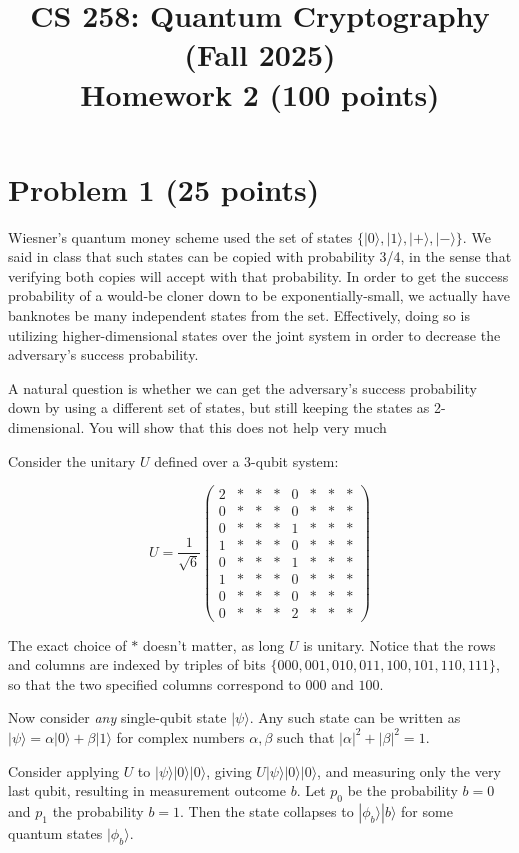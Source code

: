 \documentclass{article}
\title{CS 258: Quantum Cryptography (Fall 2025)\\ Homework 2 (100 points)}
\author{}
\date{}
\begin{document}
\maketitle



\section{Problem 1 (25 points)}

Wiesner's quantum money scheme used the set of states $\{|0\rangle,|1\rangle,|+\rangle,|-\rangle\}$. We said in class that such states can be copied with probability 3/4, in the sense that verifying both copies will accept with that probability. In order to get the success probability of a would-be cloner down to be exponentially-small, we actually have banknotes be many independent states from the set. Effectively, doing so is utilizing higher-dimensional states over the joint system in order to decrease the adversary's success probability.

A natural question is whether we can get the adversary's success probability down by using a different set of states, but still keeping the states as 2-dimensional. You will show that this does not help very much

Consider the unitary $U$ defined over a 3-qubit system:

\[U=\frac{1}{\sqrt{6}}\left(\begin{array}{cccccccc}
2&*&*&*&0&*&*&*\\
0&*&*&*&0&*&*&*\\
0&*&*&*&1&*&*&*\\
1&*&*&*&0&*&*&*\\
0&*&*&*&1&*&*&*\\
1&*&*&*&0&*&*&*\\
0&*&*&*&0&*&*&*\\
0&*&*&*&2&*&*&*
\end{array}\right)\]

The exact choice of $*$ doesn't matter, as long $U$ is unitary. Notice that the rows and columns are indexed by triples of bits $\{000,001,010,011,100,101,110,111\}$, so that the two specified columns correspond to $000$ and $100$.

Now consider \emph{any} single-qubit state $|\psi\rangle$. Any such state can be written as $|\psi\rangle=\alpha|0\rangle+\beta|1\rangle$ for complex numbers $\alpha,\beta$ such that $|\alpha|^2+|\beta|^2=1$.

Consider applying $U$ to $|\psi\rangle|0\rangle|0\rangle$, giving $U|\psi\rangle|0\rangle|0\rangle$, and measuring only the very last qubit, resulting in measurement outcome $b$. Let $p_0$ be the probability $b=0$ and $p_1$ the probability $b=1$. Then the state collapses to $|\phi_b\rangle|b\rangle$ for some quantum states $|\phi_b\rangle$.
\end{document}
